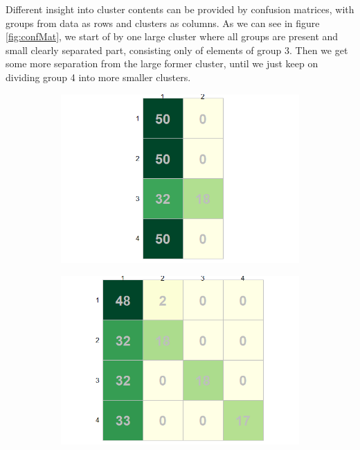 \documentclass[12pt]{article}
\begin{document}
Different insight into cluster contents can be provided by confusion matrices, with groups from data as rows and clusters as columns. 
As we can see in figure \ref{fig:confMat}, we start of by one large cluster where all groups are present and small clearly separated part, consisting only of elements of group 3. Then we get some more separation from the large
former cluster, until we just keep on dividing group 4 into more smaller clusters. 
\begin{figure}[h!]
  \begin{subfigure}[b]{0.33\linewidth}
      \centering
      \includegraphics[width=\textwidth]{../images/project2/confMat_2.png}
   \caption{}\label{fig:confMat_2}
  \end{subfigure}%
  \begin{subfigure}[b]{0.33\linewidth}
      \centering
   \includegraphics[width=\textwidth]{../images/project2/confMat_4.png}

\end{subfigure}
\end{figure}
\end{document}
